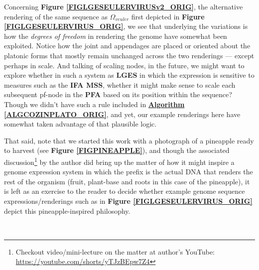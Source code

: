 \documentclass[a4paper, 18pt]{book} %
\newcommand{\comment}[1]{}
\begin{document}
\begin{appendices}
Concerning \textbf{Figure \ref{FIGLGESEULERVIRUSv2_ORIG}}, the alternative rendering  of the same sequence as $\Omega_{veuler}$ first depicted in \textbf{Figure \ref{FIGLGESEULERVIRUS_ORIG}}, we see that underlying the variations is how the \textit{degrees of freedom} in rendering the genome have somewhat been exploited. Notice how the joint and appendages are placed or oriented about the platonic forms that mostly remain unchanged across the two renderings --- except perhaps in scale. And talking of scaling nodes, in the future, we might want to explore whether in such a system as \textbf{LGES} in which the expression is sensitive to measures such as the \textbf{IFA MSS}, whether it might make sense to scale each subsequent pf-node in the \textbf{PFA} based on its position within the sequence? Though we didn't have such a rule included in \textbf{\hyperref[ALGCOZINPLATO_ORIG]{Algorithm \ref{ALGCOZINPLATO_ORIG}}}, and yet, our example renderings here have somewhat taken advantage of that plausible logic.

That said, note that we started this work with a photograph of a pineapple ready to harvest (see \textbf{Figure \ref{FIGPINEAPPLE}}), and though the associated discussion\footnote{Checkout video/mini-lecture on the matter at author's YouTube: \url{https://youtube.com/shorts/yTJzBEpw7Z4}} by the author did bring up the matter of how it might inspire a genome expression system in which the prefix is the actual DNA that renders the rest of the organism (fruit, plant-base and roots in this case of the pineapple), it is left as an exercise to the reader to decide whether example genome sequence expressions/renderings such as in \textbf{Figure \ref{FIGLGESEULERVIRUS_ORIG}} depict this pineapple-inspired philosophy.








\end{appendices}








\vspace{5cm}
\\
\end{document}
